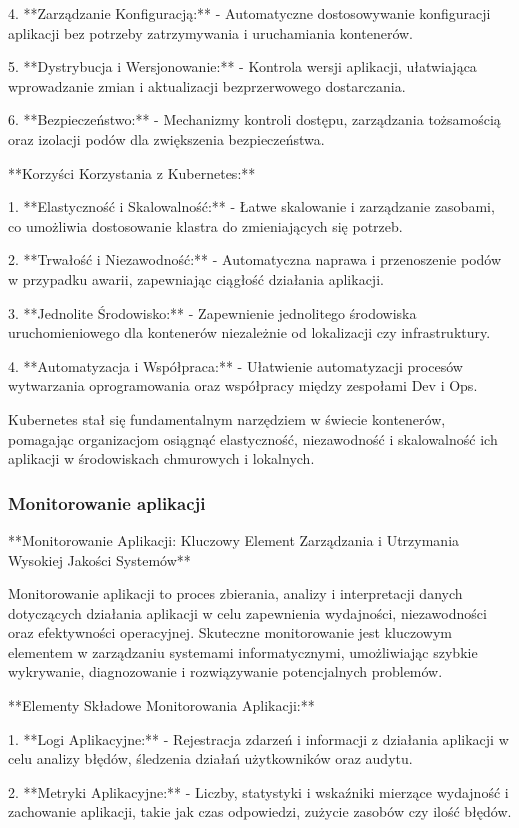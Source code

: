 4. **Zarządzanie Konfiguracją:**
   - Automatyczne dostosowywanie konfiguracji aplikacji bez potrzeby zatrzymywania i uruchamiania kontenerów.

5. **Dystrybucja i Wersjonowanie:**
   - Kontrola wersji aplikacji, ułatwiająca wprowadzanie zmian i aktualizacji bezprzerwowego dostarczania.

6. **Bezpieczeństwo:**
   - Mechanizmy kontroli dostępu, zarządzania tożsamością oraz izolacji podów dla zwiększenia bezpieczeństwa.

**Korzyści Korzystania z Kubernetes:**

1. **Elastyczność i Skalowalność:**
   - Łatwe skalowanie i zarządzanie zasobami, co umożliwia dostosowanie klastra do zmieniających się potrzeb.

2. **Trwałość i Niezawodność:**
   - Automatyczna naprawa i przenoszenie podów w przypadku awarii, zapewniając ciągłość działania aplikacji.

3. **Jednolite Środowisko:**
   - Zapewnienie jednolitego środowiska uruchomieniowego dla kontenerów niezależnie od lokalizacji czy infrastruktury.

4. **Automatyzacja i Współpraca:**
   - Ułatwienie automatyzacji procesów wytwarzania oprogramowania oraz współpracy między zespołami Dev i Ops.

Kubernetes stał się fundamentalnym narzędziem w świecie kontenerów, pomagając organizacjom osiągnąć elastyczność, niezawodność i skalowalność ich aplikacji w środowiskach chmurowych i lokalnych.
\subsubsection{Monitorowanie aplikacji}
**Monitorowanie Aplikacji: Kluczowy Element Zarządzania i Utrzymania Wysokiej Jakości Systemów**

Monitorowanie aplikacji to proces zbierania, analizy i interpretacji danych dotyczących działania aplikacji w celu zapewnienia wydajności, niezawodności oraz efektywności operacyjnej. Skuteczne monitorowanie jest kluczowym elementem w zarządzaniu systemami informatycznymi, umożliwiając szybkie wykrywanie, diagnozowanie i rozwiązywanie potencjalnych problemów.

**Elementy Składowe Monitorowania Aplikacji:**

1. **Logi Aplikacyjne:**
   - Rejestracja zdarzeń i informacji z działania aplikacji w celu analizy błędów, śledzenia działań użytkowników oraz audytu.

2. **Metryki Aplikacyjne:**
   - Liczby, statystyki i wskaźniki mierzące wydajność i zachowanie aplikacji, takie jak czas odpowiedzi, zużycie zasobów czy ilość błędów.

